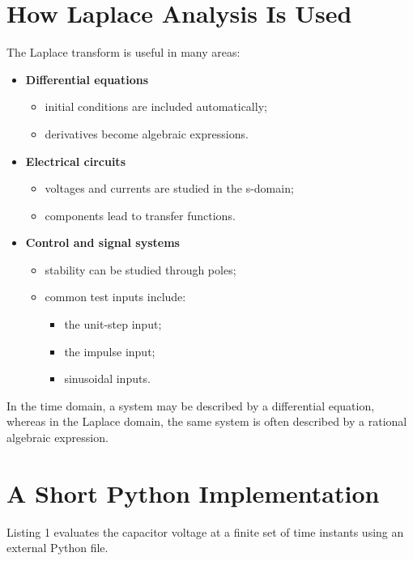 \documentclass[10pt]{article}
\begin{document}
\section{How Laplace Analysis Is Used}
The Laplace transform is useful in many areas:
\begin{itemize}
    \item \textbf{Differential equations}
    \begin{itemize}
        \item initial conditions are included automatically;
        \item derivatives become algebraic expressions.
    \end{itemize}
    \item \textbf{Electrical circuits}
    \begin{itemize}
        \item voltages and currents are studied in the s-domain;
        \item components lead to transfer functions.
    \end{itemize}
    \item \textbf{Control and signal systems}
    \begin{itemize}
        \item stability can be studied through poles;
        \item common test inputs include:
        \begin{itemize}
            \item[$\triangleright$] the unit-step input;
            \item[$\triangleright$] the impulse input;
            \item[$\triangleright$] sinusoidal inputs.
        \end{itemize}
    \end{itemize}
\end{itemize}
In the time domain, a system may be described by a differential equation, whereas in the Laplace domain, the same system is often described by a rational algebraic expression.

\section{A Short Python Implementation}
Listing 1 evaluates the capacitor voltage at a finite set of time instants using an external Python file.
\end{document}
